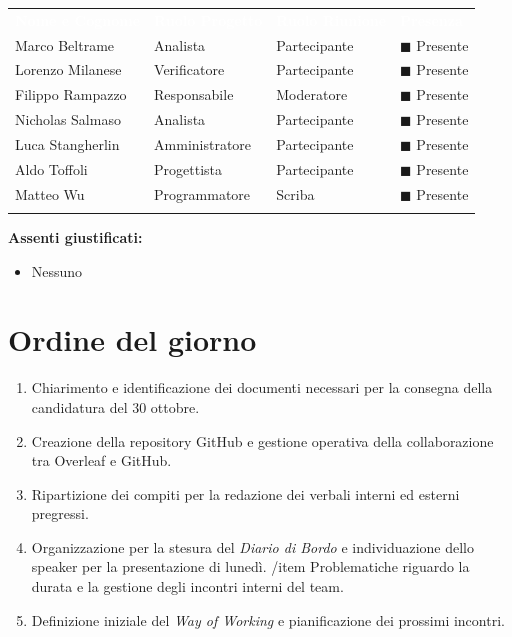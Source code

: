 \documentclass[12pt,a4paper]{article}
\newcommand{\tightlist}{\setlength{\itemsep}{1pt}\setlength{\parskip}{0pt}}
\begin{document}
\begin{center}
\begin{tabularx}{\linewidth}{>{\hsize=1.2\hsize\raggedright\arraybackslash}X>{\hsize=1.0\hsize\centering\arraybackslash}X>{\hsize=1.0\hsize\centering\arraybackslash}X>{\hsize=0.8\hsize\centering\arraybackslash}X}
\rowcolor{bfblue}\textcolor{white}{\textbf{Nome e Cognome}} & \textcolor{white}{\textbf{Ruolo Progetto}} & \textcolor{white}{\textbf{Ruolo Riunione}} & \textcolor{white}{\textbf{Presenza}} \\
Marco Beltrame & Analista & Partecipante & $\blacksquare$ Presente \\ \arrayrulecolor{bfline}\hline
Lorenzo Milanese & Verificatore & Partecipante & $\blacksquare$ Presente \\ \arrayrulecolor{bfline}\hline
Filippo Rampazzo & Responsabile & Moderatore & $\blacksquare$ Presente \\ \arrayrulecolor{bfline}\hline
Nicholas Salmaso & Analista & Partecipante & $\blacksquare$ Presente \\ \arrayrulecolor{bfline}\hline
Luca Stangherlin & Amministratore & Partecipante & $\blacksquare$ Presente \\ \arrayrulecolor{bfline}\hline
Aldo Toffoli & Progettista & Partecipante & $\blacksquare$ Presente \\ \arrayrulecolor{bfline}\hline
Matteo Wu & Programmatore & Scriba & $\blacksquare$ Presente \\ \arrayrulecolor{bfline}\hline
\end{tabularx}
\end{center}

\textbf{Assenti giustificati:}
\begin{itemize}
\tightlist
\item Nessuno
\end{itemize}

\hypertarget{ordine-del-giorno}{%
\section{Ordine del giorno}}

\begin{enumerate}
\tightlist
\item Chiarimento e identificazione dei documenti necessari per la consegna della candidatura del 30 ottobre.
\item Creazione della repository GitHub e gestione operativa della collaborazione tra Overleaf e GitHub.
\item Ripartizione dei compiti per la redazione dei verbali interni ed esterni pregressi.
\item Organizzazione per la stesura del \emph{Diario di Bordo} e individuazione dello speaker per la presentazione di lunedì.
/item Problematiche riguardo la durata e la gestione degli incontri interni del team.
\item Definizione iniziale del \emph{Way of Working} e pianificazione dei prossimi incontri.
\end{enumerate}
\end{document}
